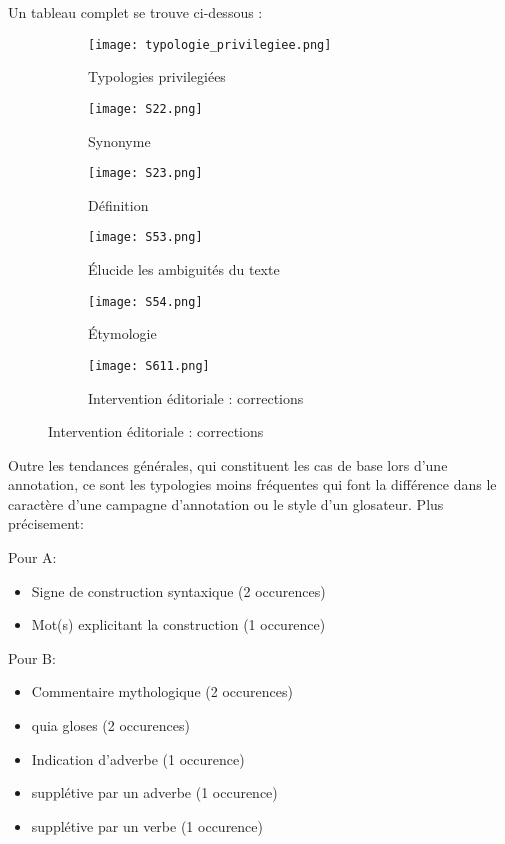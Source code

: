 \documentclass[a4paper, twoside, 12pt]{book}
\begin{document}
Un tableau complet se trouve ci-dessous : 
\begin{figure}[H]
    \begin{subfigure}{0.40\textwidth}
    \centering
    \texttt{[image: typologie\_privilegiee.png]}
    \caption{Typologies privilegiées }
    \end{subfigure}
    \begin{subfigure}{0,40\linewidth}
    \centering
    \texttt{[image: S22.png]}
    \caption{Synonyme}
    \end{subfigure}
    \begin{subfigure}{0,40\linewidth}
    \centering
    \texttt{[image: S23.png]}
    \caption{Définition}
    \end{subfigure}
     \begin{subfigure}{0,40\linewidth}
    \centering
    \texttt{[image: S53.png]}
    \caption{Élucide les ambiguités du texte}
    \end{subfigure}
    \begin{subfigure}{0,40\linewidth}
    \centering
    \texttt{[image: S54.png]}
    \caption{Étymologie}
    \end{subfigure}
        \begin{subfigure}{0,80\linewidth}
    \centering
    \texttt{[image: S611.png]}
    \caption{Intervention éditoriale : corrections}
    \end{subfigure}
\end{figure} 

\clearpage

Outre les tendances générales, qui constituent les cas de base lors d'une annotation, ce sont les typologies moins fréquentes qui font la différence dans le caractère d'une campagne d'annotation ou le \og{} style \fg{} d'un glosateur. Plus précisement:

Pour A:

\begin{itemize}
    \item {} Signe de construction syntaxique (2 occurences)
    \item {} Mot(s) explicitant la construction (1 occurence)
\end{itemize}

Pour B:

\begin{itemize}
    \item {} Commentaire mythologique (2 occurences)
    \item {} \og{} quia\fg{} gloses (2 occurences)
    \item {} Indication d'adverbe (1 occurence)
    \item {} supplétive par un adverbe (1 occurence)
    \item {} supplétive par un verbe (1 occurence)
\end{itemize}
\end{document}
